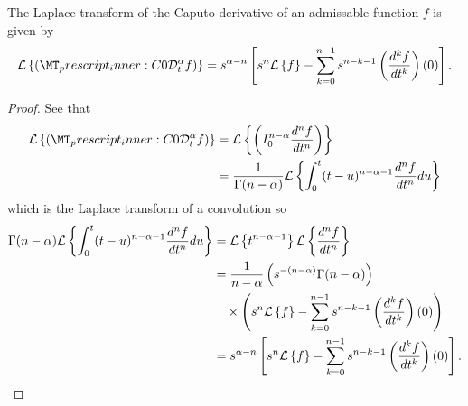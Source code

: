 \begin{lemma}
\label{lem:cap_laplace}
    The Laplace transform of the Caputo derivative of an admissable function $ f $ is given by
    \begin{align}
        \laplace{\capder{0}{t}{\alpha}{f}} = s^{\alpha - n} \left[ s^n \laplace{f} - \sum_{k=0}^{n-1} s^{n-k-1} \left( \der{f}{t}{k} \right)(0) \right].
    \end{align}
\end{lemma}
\begin{proof}
    See that
    \begin{align}
        \laplace{\capder{0}{t}{\alpha}{f}} &= \laplace{  \rli{0}{n-\alpha}{\der{f}{t}{n}}} \\
            &= \frac{1}{\Gamma(n-\alpha)}\laplace{ \int_0^t (t-u)^{n-\alpha-1} \der{f}{t}{n} du} \\ 
    \end{align}
    which is the Laplace transform of a convolution so
    \begin{align}
        \Gamma(n-\alpha)\mathcal{L} \left\{  \int_0^t (t-u)^{n-\alpha-1} \frac{d^{n}f}{dt^{n}} du \right\} &= \mathcal{L} \left\{ t^{n-\alpha-1} \right\} \mathcal{L} \left\{ \frac{d^{n}f}{dt^{n}} \right\} \\
        &= \frac{1}{n-\alpha} \left( s^{-(n-\alpha)} \Gamma(n-\alpha) \right) \\
        & \ \ \ \times \left( s^n \mathcal{L} \left\{ f \right\} - \sum_{k=0}^{n-1} s^{n-k-1} \left( \frac{d^{k}f}{dt^{k}} \right)(0) \right) \\
        &= s^{\alpha - n} \left[ s^n \mathcal{L} \left\{ f \right\} - \sum_{k=0}^{n-1} s^{n-k-1} \left( \frac{d^{k}f}{dt^{k}} \right)(0) \right].
    \end{align}
\end{proof}

